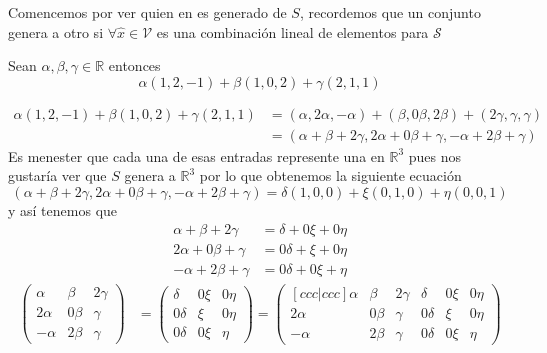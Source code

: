 \documentclass[letterpaper]{article}
\newcommand{\R}{\mathds{R}}
\renewcommand{\*}{\cdot}
\theoremstyle{definition}
\begin{document}
	Comencemos por ver quien en es generado de  $ S $, recordemos que un conjunto genera a otro si $ \forall \hat{x} \in \mathcal{V} $ es una combinación lineal de elementos para $ \mathcal{S} $ 
	
	Sean $ \alpha, \beta, \gamma \in \R $ entonces
	\[ \alpha(1,2,-1) + \beta(1,0,2) + \gamma(2,1,1)  \]
	
	\begin{align*}
		\alpha(1,2,-1) + \beta(1,0,2) + \gamma(2,1,1) & = (\alpha,2\alpha,-\alpha) + (\beta,0\beta,2\beta) + (2\gamma,\gamma,\gamma)\\
		&= (\alpha + \beta + 2\gamma, 2\alpha + 0\beta + \gamma, -\alpha + 2 \beta + \gamma)
	\end{align*}
	Es menester que cada una de esas entradas represente una en $ \R^3 $ pues nos gustaría ver que $ S $  genera a $ \R^3 $ por lo que obtenemos la siguiente ecuación
	\[ (\alpha + \beta + 2\gamma, 2\alpha + 0\beta + \gamma, -\alpha + 2 \beta + \gamma) = \delta(1,0,0) + \xi(0,1,0) + \eta(0,0,1) \]
	y así tenemos que 
	\begin{align*}
		\alpha + \beta + 2\gamma &= \delta + 0\xi + 0\eta\\
		2\alpha + 0\beta + \gamma &= 0\delta + \xi + 0\eta\\
		-\alpha + 2\beta + \gamma &= 0\delta + 0\xi + \eta
	\end{align*}
	\begin{align*}
		\begin{pmatrix}
		\alpha & \beta & 2\gamma\\
		2\alpha & 0\beta & \gamma\\
		-\alpha & 2\beta & \gamma
		\end{pmatrix} &= \begin{pmatrix}
			 \delta & 0\xi & 0\eta\\
			 0\delta & \xi & 0\eta\\
			 0\delta & 0\xi & \eta
		\end{pmatrix} = \begin{pmatrix}[ccc|ccc]
			\alpha & \beta & 2\gamma & \delta & 0\xi & 0\eta\\
			2\alpha & 0\beta & \gamma & 0\delta & \xi & 0\eta\\
			-\alpha & 2\beta & \gamma & 0\delta & 0\xi & \eta
		\end{pmatrix}
	\end{align*}
	
\end{document}

